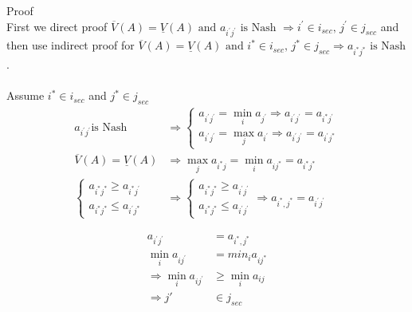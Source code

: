 \documentclass[
  course = {{IE579 Game Theory and Multi-Agent Reinforcement Learning}},
  quartile = {{4}},
  assignment = 2,
  name = {{Mohammad Mahdi Rahimi}},
  studentnumber = {{20208244}},
  email = {{mahi@kaist.ac.kr}},
  firstexercise = 1
]{aga-homework}
\begin{document}
\newpage
\exercise
\subexercise Proof
\\
First we direct proof $\overline{V}(A) = \underline{V}(A)\text{ and  } a_{i^\prime j^\prime }\text{ is Nash }\Rightarrow i^\prime \in i_{sec}\text{, } j^\prime \in j_{sec}$ and then use indirect proof for $\overline{V}(A) = \underline{V}(A)\text{ and  } i^* \in i_{sec}\text{, } j^* \in j_{sec}\Rightarrow a_{i^* j^* }\text{ is Nash}$.
\\
\\
Assume $i^* \in i_{sec}$ and $j^* \in j_{sec}$
\begin{equation}
    \begin{split}
    a_{i^\prime j^\prime} \text{is Nash} & \Rightarrow \begin{cases}
        a_{i^\prime j^\prime} = \min_i{a_{j^\prime}} \Rightarrow a_{i^\prime j^\prime} = a_{i^* j^\prime}\\
        a_{i^\prime j^\prime} = \max_j{a_{i^\prime}} \Rightarrow a_{i^\prime j^\prime} = a_{i^\prime j^*}
    \end{cases}\\
    \overline{V}(A) = \underline{V}(A) & \Rightarrow \max_j{a_{i^* j}} = \min_i{a_{i j^*}} = a_{i^* j^*}\\
    \begin{cases}
        a_{i^* j^*} \ge a_{i^* j^\prime}\\
        a_{i^* j^*} \le a_{i^\prime j^*}
    \end{cases} & \Rightarrow \begin{cases}
        a_{i^* j^*} \ge a_{i^\prime j^\prime}\\
        a_{i^* j^*} \le a_{i^\prime j^\prime}
    \end{cases} \Rightarrow a_{i^*, j^*} =  a_{i^\prime j^\prime}
    \end{split}
\end{equation}

\begin{equation}
    \begin{split}
        a_{i^\prime j^\prime} & = a_{i^*, j^*} \\
        \min_i{a_{i j^\prime}} & = min_i{a_{i j^*}}\\
        \Rightarrow \min_i{a_{i j^\prime}} & \ge \min_i{a_{ij}}\\
        \Rightarrow j\prime & \in j_{sec}
    \end{split}
\end{equation}
\end{document}
